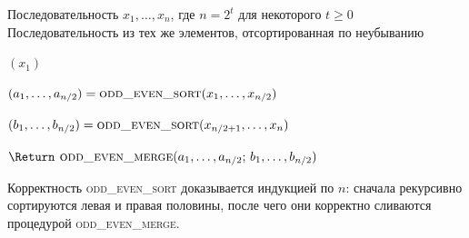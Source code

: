 \begin{algorithm}[H]
	\caption{\textsc{odd\_even\_sort}$(x_1,\dots,x_n)$}
	\begin{algorithmic}[1]
		\Require Последовательность $x_1,\dots,x_n$, где $n=2^t$ для некоторого $t \ge 0$
		\Ensure Последовательность из тех же элементов, отсортированная по неубыванию
		
		\State \Return $(x_1)$
		\EndIf
		
		\State $(a_1,\dots,a_{n/2}) = \textsc{odd\_even\_sort}(x_1,\dots,x_{n/2})$
		
		\State $(b_1,\dots,b_{n/2}) = \textsc{odd\_even\_sort}(x_{n/2+1},\dots,x_n)$
		
		\State $\Return \textsc{ odd\_even\_merge}(a_1,\dots,a_{n/2};\, b_1,\dots,b_{n/2})$
	\end{algorithmic}
\end{algorithm}

\begin{Remark}{}{}
	Корректность \textsc{odd\_even\_sort} доказывается индукцией по $n$:
	сначала рекурсивно сортируются левая и правая половины, после чего они корректно сливаются процедурой \textsc{odd\_even\_merge}.
\end{Remark}
